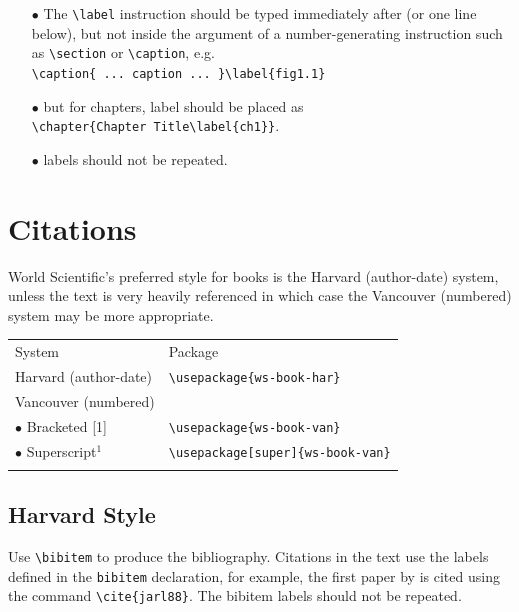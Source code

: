 \begin{itemize}
\item[$\bullet$] The \verb|\label| instruction should be typed
immediately after (or one line below), but not inside the argument of
a number-generating instruction such as \verb|\section| or \verb|\caption|, e.g.\\
\verb|\caption{ ... caption ... }\label{fig1.1}|
\item[$\bullet$] but for chapters, label should be placed as\\
    \verb|\chapter{Chapter Title\label{ch1}}|.
\item[$\bullet$] labels should not be repeated.
\end{itemize}

\section{Citations}

World Scientific's preferred style for books is the Harvard (author-date) system,
unless the text is very heavily referenced in which case the
Vancouver (numbered) system may be more appropriate.

\begin{center}
\tablefont
\begin{tabular}{@{}ll@{}}\toprule
System & Package\\\colrule
 Harvard (author-date) & \verb|\usepackage{ws-book-har}|\\
 Vancouver (numbered)\\
 \quad$\bullet$ Bracketed [1] & \verb|\usepackage{ws-book-van}|\\
 \quad$\bullet$ Superscript$^1$ & \verb|\usepackage[super]{ws-book-van}|\\\botrule
\end{tabular}
\end{center}

\subsection{Harvard Style}

Use \verb|\bibitem| to produce the bibliography.  Citations in the
text use the labels defined in the \verb|bibitem| declaration, for example,
the first paper by \cite{jarl88} is cited using the command
\verb|\cite{jarl88}|. The bibitem labels should not be repeated.

